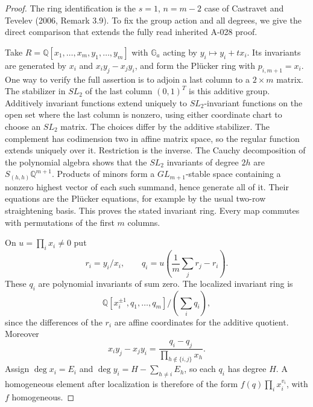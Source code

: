 \begin{proof}
The ring identification is the $s=1$, $n=m-2$ case of
Castravet and Tevelev (2006, Remark 3.9).  To fix the group
action and all degrees, we give the direct comparison that
extends the fully read inherited A-028 proof.

Take $R=\mathbb Q[x_1,\ldots,x_m,y_1,\ldots,y_m]$ with
$\mathbb G_a$ acting by $y_i\mapsto y_i+t x_i$.  Its invariants
are generated by $x_i$ and $x_i y_j-x_j y_i$, and form the
Pl\"ucker ring with $p_{i,m+1}=x_i$.  One way to verify the full
assertion is to adjoin a last column to a $2\times m$ matrix.
The stabilizer in $SL_2$ of the last column $(0,1)^T$ is this
additive group.  Additively invariant functions extend
uniquely to $SL_2$-invariant functions on the open set where
the last column is nonzero, using either coordinate chart
to choose an $SL_2$ matrix.  The choices differ by the
additive stabilizer.  The complement has codimension two in
affine matrix space, so the regular function extends uniquely
over it.  Restriction is the inverse.  The Cauchy decomposition
of the polynomial algebra shows that the $SL_2$ invariants
of degree $2h$ are $S_{(h,h)}\mathbb Q^{m+1}$.  Products of
minors form a $GL_{m+1}$-stable space containing a nonzero
highest vector of each such summand, hence generate all of it.
Their equations are the Pl\"ucker equations, for example by
the usual two-row straightening basis.  This proves the
stated invariant ring.  Every map commutes with permutations
of the first $m$ columns.

On $u=\prod_i x_i\ne0$ put
\[
 r_i=y_i/x_i,
 \qquad q_i=u\left(\frac1m\sum_jr_j-r_i\right).
 \tag{PNEW-C5}
\]
These $q_i$ are polynomial invariants of sum zero.  The
localized invariant ring is
\[
\mathbb Q[x_i^{\pm1},q_1,\ldots,q_m]/(\sum_iq_i),
\]
since the differences of the $r_i$ are affine coordinates
for the additive quotient.  Moreover
\[
 x_i y_j-x_j y_i
       =\frac{q_i-q_j}{\prod_{h\notin\{i,j\}}x_h}.
 \tag{PNEW-C6}
\]
Assign $\deg x_i=E_i$ and
$\deg y_i=H-\sum_{h\ne i}E_h$, so each $q_i$ has degree $H$.
A homogeneous element after localization is therefore of
the form $f(q)\prod_i x_i^{v_i}$, with $f$ homogeneous.


\end{proof}
